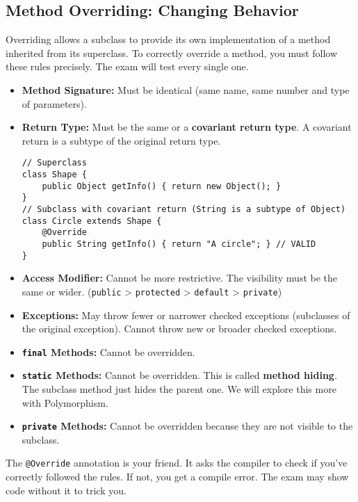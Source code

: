 \documentclass[12pt]{article}
\begin{document}
\begin{enumerate}[label=(\arabic*)]
\subsection{Method Overriding: Changing Behavior}
Overriding allows a subclass to provide its own implementation of a method inherited from its superclass. To correctly override a method, you must follow these rules precisely. The exam will test every single one.
\begin{itemize}
    \item \textbf{Method Signature:} Must be identical (same name, same number and type of parameters).
    \item \textbf{Return Type:} Must be the same or a \textbf{covariant return type}. A covariant return is a subtype of the original return type.
\begin{verbatim}
// Superclass
class Shape {
    public Object getInfo() { return new Object(); }
}
// Subclass with covariant return (String is a subtype of Object)
class Circle extends Shape {
    @Override
    public String getInfo() { return "A circle"; } // VALID
}
\end{verbatim}
    \item \textbf{Access Modifier:} Cannot be more restrictive. The visibility must be the same or wider. (\texttt{public} > \texttt{protected} > \texttt{default} > \texttt{private})
    \item \textbf{Exceptions:} May throw fewer or narrower checked exceptions (subclasses of the original exception). Cannot throw new or broader checked exceptions.
    \item \textbf{\texttt{final} Methods:} Cannot be overridden.
    \item \textbf{\texttt{static} Methods:} Cannot be overridden. This is called \textbf{method hiding}. The subclass method just hides the parent one. We will explore this more with Polymorphism.
    \item \textbf{\texttt{private} Methods:} Cannot be overridden because they are not visible to the subclass.
\end{itemize}
The \texttt{@Override} annotation is your friend. It asks the compiler to check if you've correctly followed the rules. If not, you get a compile error. The exam may show code without it to trick you.


\end{enumerate}
\end{document}
